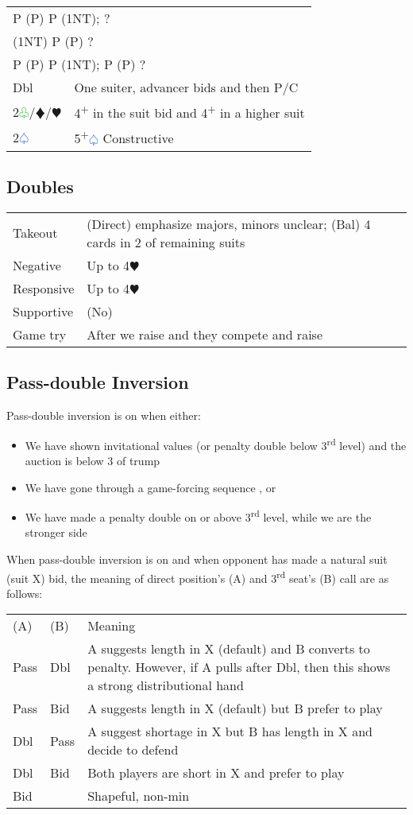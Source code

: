 \documentclass{article}
\renewcommand{\sp}{\textcolor{RoyalBlue}{$\varspade$}}
\newcommand{\he}{\textcolor{RubineRed}{$\varheart$}}
\newcommand{\di}{\textcolor{Peach}{$\vardiamond$}}
\newcommand{\cl}{\textcolor{LimeGreen}{$\varclub$}}
\newcommand{\nt}{\relsize{-1}NT\relsize{1}}
\newcommand{\up}{\textsuperscript{+}}
\begin{document}
\begin{tabular}{|l|p{6.5cm}}
	\multicolumn{2}{l}{P (P) P (1\nt{}); ?} \\
	\multicolumn{2}{l}{(1\nt{}) P (P) ?} \\
	\multicolumn{2}{l}{P (P) P (1\nt{}); P (P) ?} \\
    Dbl & One suiter, advancer bids and then P/C \\
    2\cl{}/\di{}/\he{} & 4\up{} in the suit bid and 4\up{} in a higher suit \\
    2\sp{} & 5\up\sp{} Constructive \\
\end{tabular}

\subsection{Doubles}

\begin{tabular}{|l|p{6.5cm}}
    Takeout & (Direct) emphasize majors, minors unclear; (Bal) 4 cards in 2 of remaining suits \\
    Negative & Up to 4\he{}\\
    Responsive & Up to 4\he{}\\
    Supportive & (No) \\
    Game try & After we raise and they compete and raise \\
\end{tabular}

\subsection{Pass-double Inversion}
Pass-double inversion is on when either:
\begin{itemize}
\itemsep0em
	\item We have shown invitational values (or penalty double below 3\textsuperscript{rd} level) and the auction is below 3 of trump
	\item We have gone through a game-forcing sequence , or
	\item We have made a penalty double on or above 3\textsuperscript{rd} level, while we are the stronger side
\end{itemize}
When pass-double inversion is on and when opponent has made a natural suit (suit X) bid, the meaning of direct position's (A) and 3\textsuperscript{rd} seat's (B) call are as follows: \\
\begin{tabular}{|l|l|p{6cm}}
	(A) & (B) & Meaning \\
	Pass & Dbl & A suggests length in X (default) and B converts to penalty. However, if A pulls after Dbl, then this shows a strong distributional hand \\
	Pass & Bid & A suggests length in X (default) but B prefer to play \\
	Dbl & Pass & A suggest shortage in X but B has length in X and decide to defend \\
	Dbl & Bid & Both players are short in X and prefer to play \\
	Bid & & Shapeful, non-min
\end{tabular}
\end{document}
